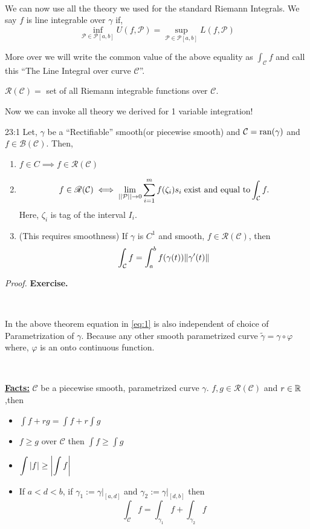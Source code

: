 \documentclass[../Analysis-3.tex]{subfiles}
\begin{document}
\

We can now use all the theory we used for the standard Riemann Integrals. We say $f$ is line integrable over $\gamma$ if,
\[\inf_{\mathcal{P} \in \mathscr{P}[a,b]} U(f,\mathcal{P}) = \sup_{\mathcal{P} \in \mathscr{P}[a,b]} L(f,\mathcal{P})\]

More over we will write the common value of the above equality as $\displaystyle\int_{\mathcal{C}} f$ and call this ``The Line Integral over curve $\mathcal{C}$''.

\begin{notnBox}
  $\mathscr{R}(\mathcal{C}) = $ set of all Riemann integrable functions over $\mathcal{C}$.
\end{notnBox}

Now we can invoke all theory we derived for 1 variable integration!

\begin{Thm}{}{23:1}
  Let, $\gamma$ be a ``Rectifiable'' smooth(or piecewise smooth) and $\mathcal{C} = \operatorname{ran}(\gamma)$ and $f \in \mathscr{B}(\mathcal{C})$. Then,
  \begin{enumerate}
    \item $f \in C \implies f \in \mathscr{R}(\mathcal{C})$
    \item \[ f \in \mathscr{R}(\mathcal{C}) \iff \lim_{||\mathcal{P}||\to 0} \sum_{i=1}^{m} f(\zeta_i)s_i \hspace{0.1cm} \text{exist and equal to}\int_{\mathcal{C}} f.\] Here, $\zeta_i$ is tag of the interval $I_i$.

    \item (This requires smoothness) If $\gamma$ is $C^1$ and smooth, $f \in \mathscr{R}(\mathcal{C})$, then
          \[\int_{\mathcal{C}} f = \int_a^b f(\gamma(t))\norm{\gamma'(t)} \label{eq:1}\]

  \end{enumerate}
\end{Thm}

\textit{Proof.} \textbf{Exercise.}

\

In the above theorem equation in \ref{eq:1} is also independent of choice of Parametrization of $\gamma$. Because any other smooth parametrized curve $\tilde{\gamma} = \gamma \circ \varphi$ where, $\varphi$ is an onto continuous function.

\

\textbf{\underline{Facts:}} $\mathcal{C}$ be a piecewise smooth, parametrized curve $\gamma$. $f,g \in \mathscr{R}(\mathcal{C})$ and $r \in \mathbb{R}$,then
\begin{itemize}
  \item $\displaystyle\int f+rg = \displaystyle\int f + r\displaystyle\int g $
  \item $f \ge g$ over $\mathcal{C}$ then $\displaystyle\int f \ge \displaystyle\int g$
  \item $\displaystyle\int \abs{f} \ge \abs{\displaystyle\int f}$
  \item If $a<d<b$, if $\gamma_1 := \gamma |_{[a,d]}$ and $\gamma_2 := \gamma |_{[d,b]}$ then
        \[\int_{\mathcal{C}} f = \int_{\gamma_1}f + \int_{\gamma_2} f \]
\end{itemize}
\end{document}
